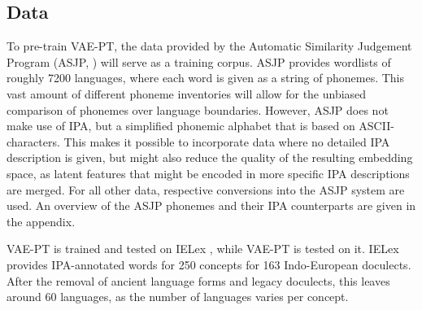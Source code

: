 \documentclass[6pt]{article}
\begin{document}
\subsection{Data}
To pre-train VAE-PT,  the data provided by the Automatic Similarity Judgement Program (ASJP, \cite{wichmann2010asjp}) will serve as a training corpus. ASJP provides wordlists of roughly 7200 languages, where each word is given as a string of phonemes. This vast amount of different phoneme inventories will allow for the unbiased comparison of phonemes over language boundaries. However, ASJP does not make use of IPA, but a simplified phonemic alphabet that is based on ASCII-characters. This makes it possible to incorporate data where no detailed IPA description is given, but might also reduce the quality of the resulting embedding space, as latent features that might be encoded in more specific IPA descriptions are merged. For all other data, respective conversions into the ASJP system are used.  An overview of the ASJP phonemes and their IPA counterparts are given in the appendix.

VAE-PT is trained and tested on IELex \citep{dunn2012indo}, while VAE-PT is tested on it. IELex provides IPA-annotated words for 250 concepts for 163 Indo-European doculects. After the removal of ancient language forms and legacy doculects, this leaves around 60 languages, as the number of languages varies per concept.
\end{document}
